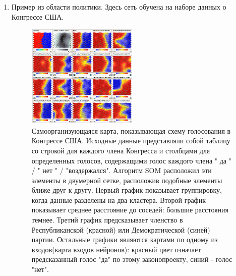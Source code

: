 \documentclass[a4paper,12pt]{article}
\begin{document}
\begin{enumerate}
  \item Пример из области политики. Здесь сеть обучена на наборе данных о Конгрессе США.
  \begin{figure}[H]
    \centering
    \includegraphics[width=0.5\textwidth]{congress.png}
    \caption{Самоорганизующаяся карта, показывающая схему голосования в Конгрессе США. Исходные данные представляли собой таблицу со строкой для каждого члена Конгресса и столбцами для определенных голосов, содержащими голос каждого члена " да " / " нет " / "воздержался". Алгоритм SOM расположил эти элементы в двумерной сетке, расположив подобные элементы ближе друг к другу. Первый график показывает группировку, когда данные разделены на два кластера. Второй график показывает среднее расстояние до соседей: большие расстояния темнее. Третий график предсказывает членство в Республиканской (красной) или Демократической (синей) партии. Остальные графики являются картами по одному из входов(карта входов нейронов): красный цвет означает предсказанный голос "да" по этому законопроекту, синий - голос "нет".\cite{wikipedia_map_en}}
    \label{img:congress}
  \end{figure}


\end{enumerate}
\end{document}
